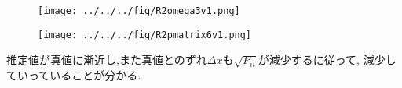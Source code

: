 \documentclass[class=article, crop=false, dvipdfmx, fleqn]{standalone}
\begin{document}
\begin{figure}[H]
 \begin{minipage}{0.5\hsize}
  \begin{center}
   \texttt{[image: ../../../fig/R2omega3v1.png]}
  \end{center}
 \end{minipage}
 \begin{minipage}{0.5\hsize}
 \end{minipage}
\end{figure}

\vspace{-1cm}

\begin{figure}[H]
 \begin{minipage}{0.5\hsize}
  \begin{center}
   \texttt{[image: ../../../fig/R2pmatrix6v1.png]}
  \end{center}
 \end{minipage}
 \begin{minipage}{0.5\hsize}
 \end{minipage}
\end{figure}

推定値が真値に漸近し,また真値とのずれ$\Delta x$も$\sqrt{P_{ii}}$が減少するに従って,
減少していっていることが分かる.
\end{document}
